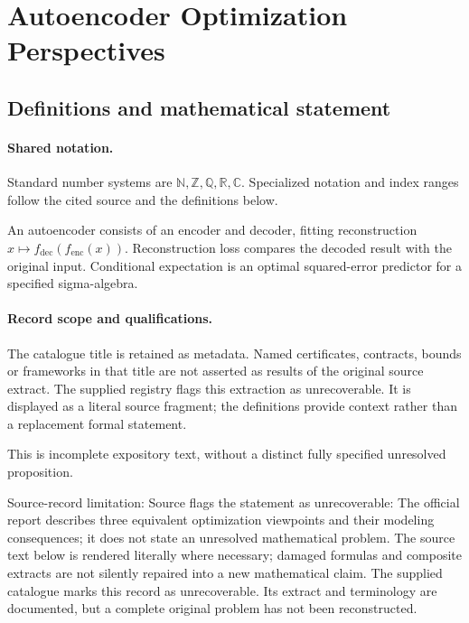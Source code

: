 \documentclass[11pt]{article}
\begin{document}
\section{Autoencoder Optimization Perspectives}\label{statement}

\subsection{Definitions and mathematical statement}

\paragraph{Shared notation.}Standard number systems are $\mathbb N,\mathbb Z,\mathbb Q,\mathbb R,\mathbb C$. Specialized notation and index ranges follow the cited source and the definitions below.


An autoencoder consists of an encoder and decoder, fitting reconstruction $x\mapsto f_{\mathrm{dec}}(f_{\mathrm{enc}}(x))$. Reconstruction loss compares the decoded result with the original input. Conditional expectation is an optimal squared-error predictor for a specified sigma-algebra.
\paragraph{Record scope and qualifications.}
The catalogue title is retained as metadata. Named certificates, contracts, bounds or frameworks in that title are not asserted as results of the original source extract.
The supplied registry flags this extraction as unrecoverable. It is displayed as a literal source fragment; the definitions provide context rather than a replacement formal statement.

This is incomplete expository text, without a distinct fully specified unresolved proposition.

Source-record limitation: Source flags the statement as unrecoverable: The official report describes three equivalent optimization viewpoints and their modeling consequences; it does not state an unresolved mathematical problem.
The source text below is rendered literally where necessary; damaged formulas and composite extracts are not silently repaired into a new mathematical claim.
The supplied catalogue marks this record as unrecoverable. Its extract and terminology are documented, but a complete original problem has not been reconstructed.
\end{document}
